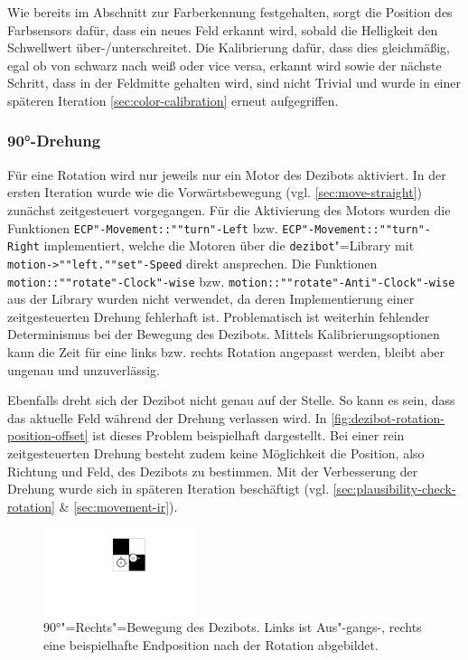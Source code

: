 Wie bereits im Abschnitt zur Farberkennung festgehalten, sorgt die Position des Farbsensors dafür, dass ein neues Feld erkannt wird, sobald die Helligkeit den Schwellwert über-/unterschreitet. Die Kalibrierung dafür, dass dies gleichmäßig, egal ob von schwarz nach weiß oder vice versa, erkannt wird sowie der nächste Schritt, dass in der Feldmitte gehalten wird, sind nicht Trivial und wurde in einer späteren Iteration \autoref{sec:color-calibration} erneut aufgegriffen. 



\subsubsection{90°-Drehung}
\label{sec:turn-90}

Für eine Rotation wird nur jeweils nur ein Motor des Dezibots aktiviert. In der ersten Iteration wurde wie die Vorwärtsbewegung (vgl. \autoref{sec:move-straight}) zunächst zeitgesteuert vorgegangen. Für die Aktivierung des Motors wurden die Funktionen \texttt{ECP"-Movement::""turn"-Left} bzw. \texttt{ECP"-Movement::""turn"-Right} implementiert, welche die Motoren über die \texttt{dezibot}"=Library mit \texttt{motion->""left.""set"-Speed} direkt ansprechen. Die Funktionen \texttt{motion::""rotate"-Clock"-wise} bzw. \texttt{motion::""rotate"-Anti"-Clock"-wise} aus der Library wurden nicht verwendet, da deren Implementierung einer zeitgesteuerten Drehung fehlerhaft ist. Problematisch ist weiterhin fehlender Determinismus bei der Bewegung des Dezibots. Mittels Kalibrierungsoptionen kann die Zeit für eine links bzw. rechts Rotation angepasst werden, bleibt aber ungenau und unzuverlässig.

Ebenfalls dreht sich der Dezibot nicht genau auf der Stelle. So kann es sein, dass das aktuelle Feld während der Drehung verlassen wird. In \autoref{fig:dezibot-rotation-position-offset} ist dieses Problem beispielhaft dargestellt. Bei einer rein zeitgesteuerten Drehung besteht zudem keine Möglichkeit die Position, also Richtung und Feld, des Dezibots zu bestimmen. Mit der Verbesserung der Drehung wurde sich in späteren Iteration beschäftigt (vgl. \autoref{sec:plausibility-check-rotation} \& \autoref{sec:movement-ir}).

\begin{figure}[h]
    \centering
    \includegraphics[width=0.4\textwidth]{../assets/dezibot_rotation_position_offset.pdf}
    \caption{90°"=Rechts"=Bewegung des Dezibots. Links ist Aus"-gangs-, rechts eine beispielhafte Endposition nach der Rotation abgebildet.}
    \label{fig:dezibot-rotation-position-offset}
\end{figure}


